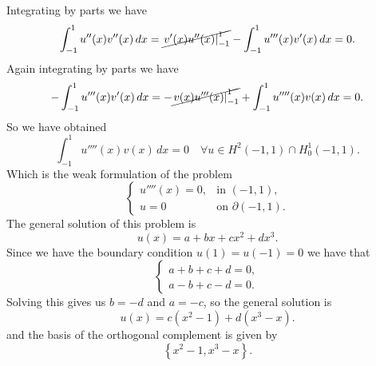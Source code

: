 \begin{enumerate}
\[    \]
    Integrating by parts we have
    \[
        \int_{-1}^1 u''(x) v''(x) \, dx = \cancel{\left. v'(x) u''(x) \right|_{-1}^1} - \int_{-1}^1 u'''(x) v'(x) \, dx = 0.
    \]
    Again integrating by parts we have
    \[
        -\int_{-1}^1 u'''(x) v'(x) \, dx = -\cancel{\left. v(x) u'''(x) \right|_{-1}^1} + \int_{-1}^1 u''''(x) v(x) \, dx = 0. 
    \]
    So we have obtained 
    \[
        \int_{-1}^1 u''''(x) v(x) \, dx = 0 \quad \forall u \in H^2(-1, 1)\cap H^1_0(-1, 1).
    \]
    Which is the weak formulation of the problem
    \[
        \begin{cases}
            u''''(x) = 0, & \text{in } (-1, 1), \\
            u = 0 & \text{on } \partial (-1, 1).
        \end{cases}
    \]
    The general solution of this problem is
    \[
        u(x) = a + bx + cx^2 + d x^3.
    \]
    Since we have the boundary condition \(u(1) = u(-1) = 0\) we have that 
    \[
        \begin{cases}
            a + b + c + d = 0, \\
            a - b + c - d = 0.
        \end{cases}
    \]
    Solving this gives us \(b = -d\) and \(a = -c\), so the general solution is
    \[
        u(x) = c(x^2 - 1) + d(x^3 - x).
    \]
    and the basis of the orthogonal complement is given by
    \[
        \left\{ x^2 - 1, x^3 - x \right\}.
    \]
\end{enumerate}

